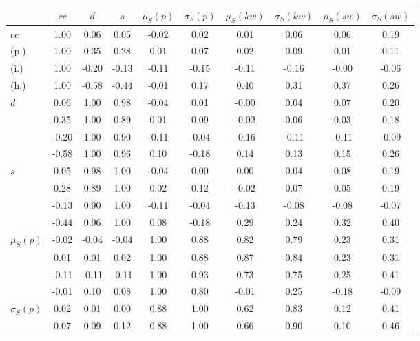 \begin{table*}[h!]
\begin{center}
\begin{tabular}{| l | c | c | c | c | c | c | c | c | c |}\hline
 & $cc$ & $d$ & $s$ & $\mu_S(p)$ & $\sigma_S(p)$ & $\mu_S(kw)$ & $\sigma_S(kw)$ & $\mu_S(sw)$ & $\sigma_S(sw)$ \\\hline
$cc$ & 1.00  & 0.06  & 0.05  & -0.02  & 0.02  & 0.01  & 0.06  & 0.06  & 0.19 \\\hline
(p.) & 1.00  & 0.35  & 0.28  & 0.01  & 0.07  & 0.02  & 0.09  & 0.01  & 0.11 \\\hline
(i.) & 1.00  & -0.20  & -0.13  & -0.11  & -0.15  & -0.11  & -0.16  & -0.00  & -0.06 \\\hline
(h.) & 1.00  & -0.58  & -0.44  & -0.01  & 0.17  & 0.40  & 0.31  & 0.37  & 0.26 \\\hline
$d$ & 0.06  & 1.00  & 0.98  & -0.04  & 0.01  & -0.00  & 0.04  & 0.07  & 0.20 \\\hline
 & 0.35  & 1.00  & 0.89  & 0.01  & 0.09  & -0.02  & 0.06  & 0.03  & 0.18 \\\hline
 & -0.20  & 1.00  & 0.90  & -0.11  & -0.04  & -0.16  & -0.11  & -0.11  & -0.09 \\\hline
 & -0.58  & 1.00  & 0.96  & 0.10  & -0.18  & 0.14  & 0.13  & 0.15  & 0.26 \\\hline
$s$ & 0.05  & 0.98  & 1.00  & -0.04  & 0.00  & 0.00  & 0.04  & 0.08  & 0.19 \\\hline
 & 0.28  & 0.89  & 1.00  & 0.02  & 0.12  & -0.02  & 0.07  & 0.05  & 0.19 \\\hline
 & -0.13  & 0.90  & 1.00  & -0.11  & -0.04  & -0.13  & -0.08  & -0.08  & -0.07 \\\hline
 & -0.44  & 0.96  & 1.00  & 0.08  & -0.18  & 0.29  & 0.24  & 0.32  & 0.40 \\\hline
$\mu_S(p)$ & -0.02  & -0.04  & -0.04  & 1.00  & 0.88  & 0.82  & 0.79  & 0.23  & 0.31 \\\hline
 & 0.01  & 0.01  & 0.02  & 1.00  & 0.88  & 0.87  & 0.84  & 0.23  & 0.31 \\\hline
 & -0.11  & -0.11  & -0.11  & 1.00  & 0.93  & 0.73  & 0.75  & 0.25  & 0.41 \\\hline
 & -0.01  & 0.10  & 0.08  & 1.00  & 0.80  & -0.01  & 0.25  & -0.18  & -0.09 \\\hline
$\sigma_S(p)$ & 0.02  & 0.01  & 0.00  & 0.88  & 1.00  & 0.62  & 0.83  & 0.12  & 0.41 \\\hline
 & 0.07  & 0.09  & 0.12  & 0.88  & 1.00  & 0.66  & 0.90  & 0.10  & 0.46 \\\hline

\end{tabular}
\end{center}
\end{table*}
